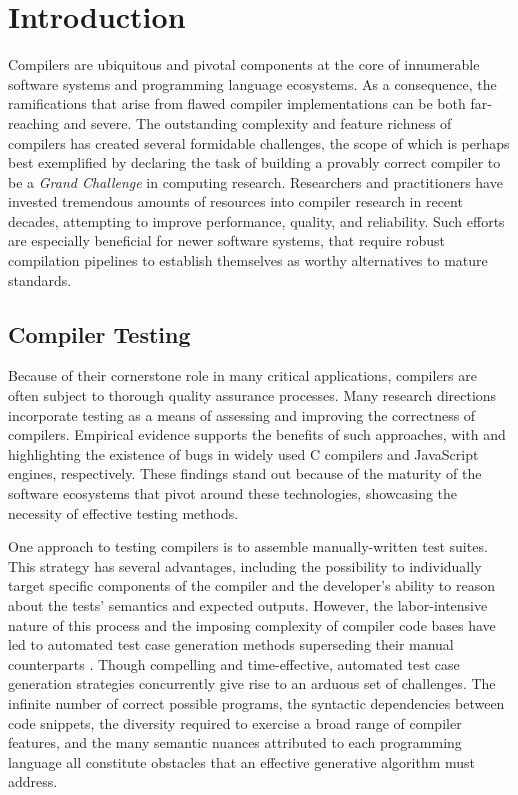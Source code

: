\chapter{\label{cha:intro}Introduction}

Compilers are ubiquitous and pivotal components
at the core of innumerable software systems and programming language ecosystems.
As a consequence, the ramifications that arise from flawed
compiler implementations can be both far-reaching and severe.
The outstanding complexity and feature richness of compilers has created
several formidable challenges, the scope of which is perhaps best exemplified
by \citet{hoare2003verifying}
declaring the task of building a provably correct compiler to be a 
\textit{Grand Challenge} in computing research.
Researchers and practitioners have invested tremendous amounts of resources
into compiler research in recent decades, attempting to improve
performance, quality, and reliability. 
Such efforts are especially beneficial for newer software systems,
that require robust compilation pipelines to establish themselves
as worthy alternatives to mature standards.


\section{Compiler Testing}

Because of their cornerstone role in many critical applications,
compilers are often subject to thorough quality assurance processes.
Many research directions incorporate testing as a means
of assessing and improving the correctness of compilers.
Empirical evidence supports the benefits of such approaches,
with \citet{sun2016toward} and \citet{holler2012fuzzing} highlighting
the existence of bugs in widely used C compilers and JavaScript engines, respectively. 
These findings stand out because of the maturity of the
software ecosystems that pivot around these technologies, showcasing
the necessity of effective testing methods.

One approach to testing compilers is to assemble manually-written test suites.
This strategy has several advantages, including the possibility to individually
target specific components of the compiler and the developer's ability to
reason about the tests' semantics and expected outputs.
However, the labor-intensive nature of this process and 
the imposing complexity of compiler code bases have
led to automated test case generation methods superseding their 
manual counterparts \citep{chen2020survey, zhao2009automated}.
Though compelling and time-effective, automated test case
generation strategies concurrently give rise to an arduous set of challenges.
The infinite number of correct possible programs, the syntactic dependencies between code snippets,
the diversity required to exercise a broad range of compiler features,
and the many semantic nuances attributed to each programming language all constitute
obstacles that an effective generative algorithm must address.

